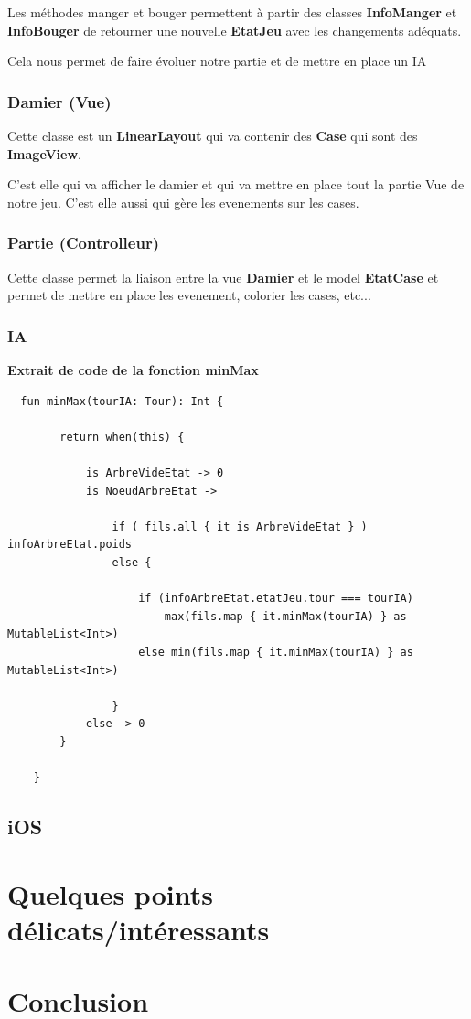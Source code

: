 \documentclass{article}
\begin{document}
  Les méthodes manger et bouger permettent à partir des classes 
  \textbf{InfoManger} et \textbf{InfoBouger} de retourner une nouvelle \textbf{EtatJeu} avec les 
  changements adéquats.

  Cela nous permet de faire évoluer notre partie et de mettre en place un IA
  
  \subsubsection{Damier (Vue)}
  
  Cette classe est un \textbf{LinearLayout} qui va contenir des \textbf{Case} 
  qui sont des \textbf{ImageView}.

  C'est elle qui va afficher le damier et qui va mettre en place tout la partie Vue 
  de notre jeu. 
  C'est elle aussi qui gère les evenements sur les cases.

  \subsubsection{Partie (Controlleur)}
  
  Cette classe permet la liaison entre la vue \textbf{Damier} et le model \textbf{EtatCase}
  et permet de mettre en place les evenement, colorier les cases, etc... 

  \subsubsection{IA}


\textbf{Extrait de code de la fonction minMax}
\begin{verbatim}
  fun minMax(tourIA: Tour): Int {

        return when(this) {

            is ArbreVideEtat -> 0
            is NoeudArbreEtat ->

                if ( fils.all { it is ArbreVideEtat } ) infoArbreEtat.poids
                else {

                    if (infoArbreEtat.etatJeu.tour === tourIA) 
                        max(fils.map { it.minMax(tourIA) } as MutableList<Int>)
                    else min(fils.map { it.minMax(tourIA) } as MutableList<Int>)

                }
            else -> 0
        }

    }
\end{verbatim}

\subsection{iOS} %


\section{Quelques points délicats/intéressants}


\section{Conclusion}




\end{document}
